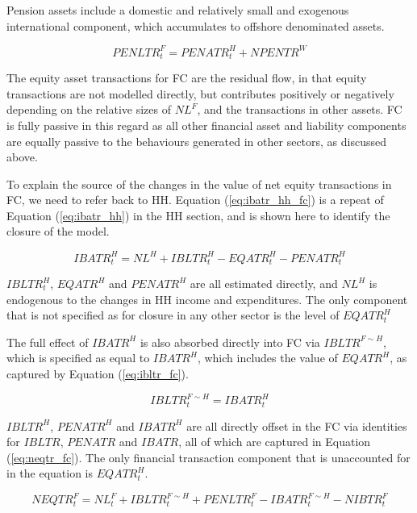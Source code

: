 \documentclass[
]{book}
\begin{document}
Pension assets include a domestic and relatively small and exogenous international
component, which accumulates to offshore denominated assets.

\begin{equation}
PENLTR^F_t = PENATR^H_t + NPENTR^W
\end{equation}

The equity asset transactions for FC are the residual flow, in that equity
transactions are not modelled directly, but contributes positively or negatively
depending on the relative sizes of \(NL^F\), and the transactions in other assets.
FC is fully passive in this regard as all other financial asset and liability components
are equally passive to the behaviours generated in other sectors, as discussed above.

To explain the source of the changes in the value of net equity transactions in FC, we need to refer back to HH. Equation (\ref{eq:ibatr_hh_fc}) is a repeat of Equation (\ref{eq:ibatr_hh}) in the HH section, and is shown here to identify the closure of the model.

\begin{equation}
IBATR^H_t = NL^H + IBLTR^H_t - EQATR^H_t - PENATR^H_t
\label{eq:ibatr_hh_fc}
\end{equation}

\(IBLTR^H_t\), \(EQATR^H\) and \(PENATR^H\) are all estimated directly, and \(NL^H\) is endogenous to the changes in HH income and expenditures. The only component that is not specified as for closure in any other sector is the level of \(EQATR^H_t\)

The full effect of \(IBATR^H\) is also absorbed directly into FC via \(IBLTR^{F\sim H}\), which is specified as equal to \(IBATR^H\), which includes the value of \(EQATR^H\), as captured by Equation (\ref{eq:ibltr_fc}).

\begin{equation}
IBLTR^{F\sim H}_t = IBATR^H_t
\label{eq:ibltr_fc}
\end{equation}

\(IBLTR^H\), \(PENATR^H\) and \(IBATR^H\) are all directly offset in the FC via identities for \(IBLTR\), \(PENATR\) and \(IBATR\), all of which are captured in Equation (\ref{eq:neqtr_fc}). The only financial transaction component that is unaccounted for in the equation is \(EQATR^H_t\).

\begin{equation}
NEQTR^F_t = NL^F_t + IBLTR^{F\sim H}_t + PENLTR^F_t - IBATR^{F\sim H}_t - NIBTR^F_t
\label{eq:neqtr_fc}
\end{equation}
\end{document}
